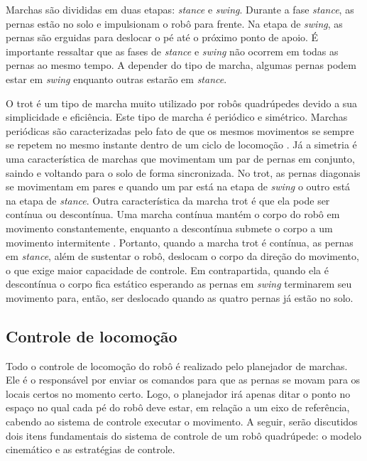 \documentclass[../main.tex]{subfiles}
\begin{document}
  Marchas são divididas em duas etapas: \textit{stance} e \textit{swing}. Durante a fase \textit{stance}, as pernas estão no solo e impulsionam o robô para frente. Na etapa de \textit{swing}, as pernas são erguidas para deslocar o pé até o próximo ponto de apoio. É importante ressaltar que as fases de \textit{stance} e \textit{swing} não ocorrem em todas as pernas ao mesmo tempo. A depender do tipo de marcha, algumas pernas podem estar em \textit{swing} enquanto outras estarão em \textit{stance}.

  O trot é um tipo de marcha muito utilizado por robôs quadrúpedes devido a sua simplicidade e eficiência. Este tipo de marcha é periódico e simétrico. Marchas periódicas são caracterizadas pelo fato de que os mesmos movimentos se sempre se repetem no mesmo instante dentro de um ciclo de locomoção \cite{de2006quadrupedal}. Já a simetria é uma característica de marchas que movimentam um par de pernas em conjunto, saindo e voltando para o solo de forma sincronizada. No trot, as pernas diagonais se movimentam em pares e quando um par está na etapa de \textit{swing} o outro está na etapa de \textit{stance}. Outra característica da marcha trot é que ela pode ser contínua ou descontínua. Uma marcha contínua mantém o corpo do robô em movimento constantemente, enquanto a descontínua submete o corpo a um movimento intermitente \cite{de2006quadrupedal}. Portanto, quando a marcha trot é contínua, as pernas em \textit{stance}, além de sustentar o robô, deslocam o corpo da direção do movimento, o que exige maior capacidade de controle. Em contrapartida, quando ela é descontínua o corpo fica estático esperando as pernas em \textit{swing} terminarem seu movimento para, então, ser deslocado quando as quatro pernas já estão no solo.

  \subsection{Controle de locomoção}

  Todo o controle de locomoção do robô é realizado pelo planejador de marchas. Ele é o responsável por enviar os comandos para que as pernas se movam para os locais certos no momento certo. Logo, o planejador irá apenas ditar o ponto no espaço no qual cada pé do robô deve estar, em relação a um eixo de referência, cabendo ao sistema de controle executar o movimento. A seguir, serão discutidos dois itens fundamentais do sistema de controle de um robô quadrúpede: o modelo cinemático e as estratégias de controle.
\end{document}
